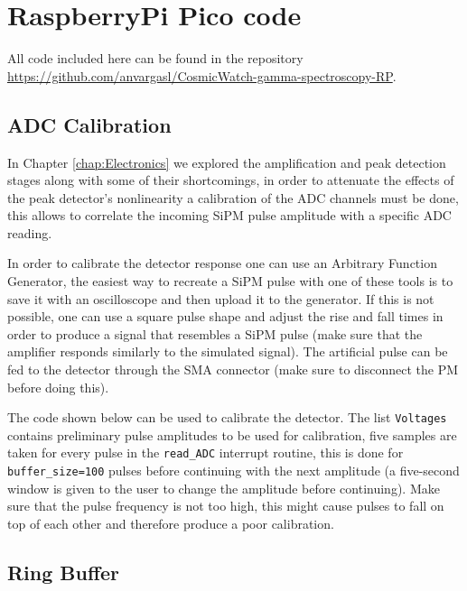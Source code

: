 \chapter{RaspberryPi Pico code}\label{app:RP_Pico_code}

All code included here can be found in the repository \\ \href{https://github.com/anvargasl/CosmicWatch-gamma-spectroscopy-RP}{https://github.com/anvargasl/CosmicWatch-gamma-spectroscopy-RP}.

\section{ADC Calibration}\label{app:calibration}

In Chapter \ref{chap:Electronics} we explored the amplification and peak detection stages along with some of their shortcomings, in order to attenuate the effects of the peak detector's nonlinearity a calibration of the ADC channels must be done, this allows to correlate the incoming SiPM pulse amplitude with a specific ADC reading.

In order to calibrate the detector response one can use an Arbitrary Function Generator, the easiest way to recreate a SiPM pulse with one of these tools is to save it with an oscilloscope and then upload it to the generator. If this is not possible, one can use a square pulse shape and adjust the rise and fall times in order to produce a signal that resembles a SiPM pulse (make sure that the amplifier responds similarly to the simulated signal). The artificial pulse can be fed to the detector through the SMA connector (make sure to disconnect the PM before doing this).

The code shown below can be used to calibrate the detector. The list \texttt{Voltages} contains preliminary pulse amplitudes to be used for calibration, five samples are taken for every pulse in the \texttt{read\_ADC} interrupt routine, this is done for \texttt{buffer\_size=100} pulses before continuing with the next amplitude (a five-second window is given to the user to change the amplitude before continuing). Make sure that the pulse frequency is not too high, this might cause pulses to fall on top of each other and therefore produce a poor calibration.



\section{Ring Buffer}

